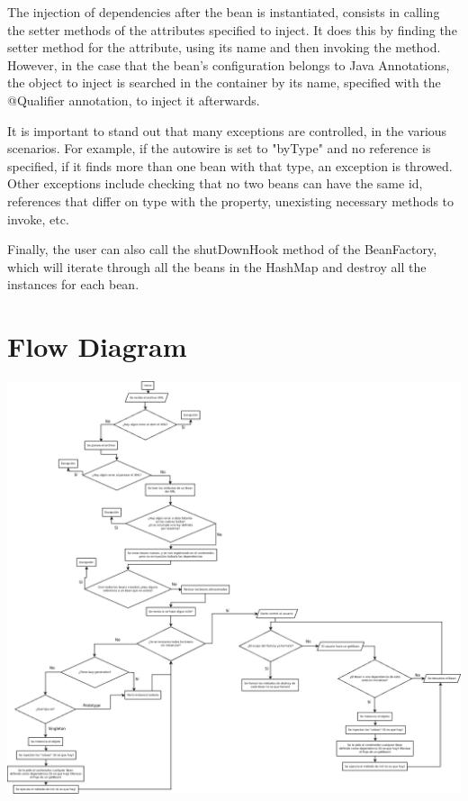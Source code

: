 \documentclass[a4paper, 12pt, notitlepage]{report}
\begin{document}
The injection of dependencies after the bean is instantiated, consists in calling the setter methods of the attributes specified to inject. It does this by finding the setter method for the attribute, using its name and then invoking the method. However, in the case that the bean's configuration belongs to Java Annotations, the object to inject is searched in the container by its name, specified with the @Qualifier annotation, to inject it afterwards. 

It is important to stand out that many exceptions are controlled, in the various scenarios. For example, if the autowire is set to "byType" and no reference is specified, if it finds more than one bean with that type, an exception is throwed. Other exceptions include checking that no two beans can have the same id, references that differ on type with the property, unexisting necessary methods to invoke, etc. 

Finally, the user can also call the shutDownHook method of the BeanFactory, which will iterate through all the beans in the HashMap and destroy all the instances for each bean. 


\newpage
\section{Flow Diagram}

\includegraphics[scale=0.20]{images/flujos.png}
\end{document}
